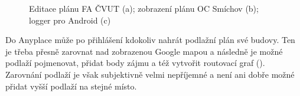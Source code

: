                       \begin{figure}
                    	  \centering
                    \hfill
                    \hfill

                    \caption{Editace plánu FA ČVUT (a); zobrazení plánu OC Smíchov (b); logger pro Android (c)\cite{zdroj25}}
                    \label{obr6}
                    \end{figure}
                    

Do Anyplace může po přihlášení kdokoliv nahrát podlažní plán své budovy. Ten je třeba přesně zarovnat nad zobrazenou Google mapou a následně je možné podlaží pojmenovat, přidat body zájmu a též vytvořit routovací graf (). Zarovnání podlaží je však subjektivně velmi nepříjemné a není ani dobře možné přidat vyšší podlaží na stejné místo.

